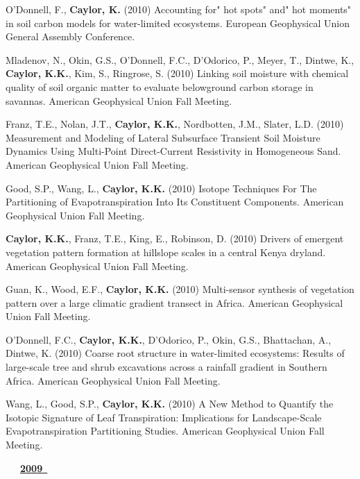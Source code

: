 \begin{etaremune}
\item O'Donnell, F., \textbf{ Caylor, K.} (2010) Accounting for" hot spots" and" hot moments" in soil carbon models for water-limited ecosystems. European Geophysical Union General Assembly Conference.
\item Mladenov, N., Okin, G.S., O'Donnell, F.C., D'Odorico, P., Meyer, T., Dintwe, K., \textbf{ Caylor, K.K.}, Kim, S., Ringrose, S. (2010) Linking soil moisture with chemical quality of soil organic matter to evaluate belowground carbon storage in savannas. American Geophysical Union Fall Meeting.
\item Franz, T.E., Nolan, J.T., \textbf{ Caylor, K.K.}, Nordbotten, J.M., Slater, L.D. (2010) Measurement and Modeling of Lateral Subsurface Transient Soil Moisture Dynamics Using Multi-Point Direct-Current Resistivity in Homogeneous Sand. American Geophysical Union Fall Meeting.
\item Good, S.P., Wang, L., \textbf{ Caylor, K.K.} (2010) Isotope Techniques For The Partitioning of Evapotranspiration Into Its Constituent Components. American Geophysical Union Fall Meeting.
\item \textbf{ Caylor, K.K.}, Franz, T.E., King, E., Robinson, D. (2010) Drivers of emergent vegetation pattern formation at hillslope scales in a central Kenya dryland. American Geophysical Union Fall Meeting.
\item Guan, K., Wood, E.F., \textbf{ Caylor, K.K.} (2010) Multi-sensor synthesis of vegetation pattern over a large climatic gradient transect in Africa. American Geophysical Union Fall Meeting.
\item O'Donnell, F.C., \textbf{ Caylor, K.K.}, D'Odorico, P., Okin, G.S., Bhattachan, A., Dintwe, K. (2010) Coarse root structure in water-limited ecosystems: Results of large-scale tree and shrub excavations across a rainfall gradient in Southern Africa. American Geophysical Union Fall Meeting.
\item Wang, L., Good, S.P., \textbf{ Caylor, K.K.} (2010) A New Method to Quantify the Isotopic Signature of Leaf Transpiration: Implications for Landscape-Scale Evapotranspiration Partitioning Studies. American Geophysical Union Fall Meeting.

\vspace{0.1in}
\mbox{\ \ \ \underline{\textbf{2009 }}}
\vspace{0.1in}


\end{etaremune}
